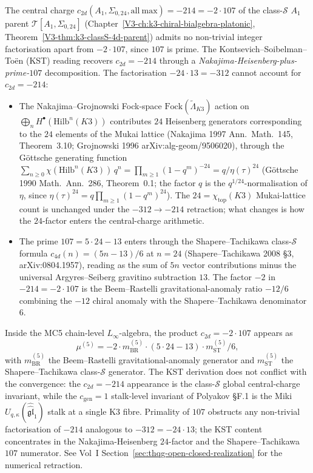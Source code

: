 \begin{remark}[Kontsevich--Soibelman--To\"en decomposition of $c_{2d}=-214$
via Nakajima/G\"ottsche]
\label{rem:mc5clmp-kst-nakajima}
The central charge
$c_{2d}(A_1, \Sigma_{0,24}, \mathrm{all\ max}) = -214 = -2\cdot 107$
of the class-$\mathcal{S}$ $A_1$ parent $\mathcal{T}[A_1,\Sigma_{0,24}]$
(Chapter~\ref{V3-ch:k3-chiral-bialgebra-platonic},
Theorem~\ref{V3-thm:k3-classS-4d-parent}) admits no non-trivial integer
factorisation apart from $-2\cdot 107$, since $107$ is prime. The
Kontsevich--Soibelman--To\"en (KST) reading recovers $c_{2d} = -214$
through a \emph{Nakajima-Heisenberg-plus-prime-$107$} decomposition.
The factorisation \(-24\cdot13=-312\) cannot account for \(c_{2d}=-214\):
\begin{itemize}
 \item The Nakajima--Grojnowski Fock-space
 $\mathrm{Fock}(\widetilde{\Lambda}_{K3})$ action on
 $\bigoplus_n H^\bullet(\mathrm{Hilb}^n(K3))$ contributes $24$
 Heisenberg generators corresponding to the $24$ elements of the
 Mukai lattice (Nakajima 1997 \textup{Ann.~Math.}~145,
 Theorem~3.10; Grojnowski 1996 \textup{arXiv:alg-geom/9506020}),
 through the G\"ottsche generating function
 $\sum_{n\ge 0}\chi(\mathrm{Hilb}^n(K3))\,q^n =
 \prod_{m\ge 1}(1-q^m)^{-24} = q/\eta(\tau)^{24}$ (G\"ottsche 1990
 \textup{Math.~Ann.}~286, Theorem~0.1; the factor $q$ is the
 $q^{1/24}$-normalisation of $\eta$, since
 $\eta(\tau)^{24}=q\prod_{m\ge1}(1-q^m)^{24}$). The $24 = \chi_{\mathrm{top}}(K3)$
 Mukai-lattice count is unchanged under the $-312 \to -214$
 retraction; what changes is how the $24$-factor enters the
 central-charge arithmetic.
 \item The prime $107 = 5\cdot 24 - 13$ enters through the
 Shapere--Tachikawa class-$\mathcal S$ formula
 $c_{4d}(n) = (5n - 13)/6$ at $n = 24$
 (Shapere--Tachikawa 2008 \S 3, arXiv:0804.1957), reading as the
 sum of $5n$ vector contributions minus the universal
 Argyres--Seiberg gravitino subtraction $13$. The factor $-2$ in
 $-214 = -2\cdot 107$ is the Beem--Rastelli gravitational-anomaly
 ratio $-12/6$ combining the $-12$ chiral anomaly with the
 Shapere--Tachikawa denominator $6$.
\end{itemize}
Inside the MC5 chain-level $L_\infty$-algebra, the product
$c_{2d} = -2\cdot 107$ appears as
\[
 \mu^{(5)}
 = -2\cdot m^{(5)}_{\mathrm{BR}} \cdot (5\cdot 24 - 13)\cdot
 m^{(5)}_{\mathrm{ST}}/6,
\]
with $m^{(5)}_{\mathrm{BR}}$ the Beem--Rastelli gravitational-anomaly
generator and $m^{(5)}_{\mathrm{ST}}$ the Shapere--Tachikawa
class-$\mathcal S$ generator. The KST derivation does not conflict with
the convergence: the $c_{2d} = -214$ appearance is the class-$\mathcal{S}$
global central-charge invariant, while the $c_{\mathrm{gen}} = 1$
stalk-level invariant of Polyakov \S F.1 is the Miki
$U_{q,\kappa}(\widehat{\widehat{\mathfrak{gl}}}_1)$ stalk at a single
K3 fibre. Primality of $107$ obstructs any non-trivial factorisation
of $-214$ analogous to $-312 = -24\cdot 13$; the KST content
concentrates in the Nakajima-Heisenberg $24$-factor and the
Shapere--Tachikawa $107$ numerator. See Vol~I
Section~\ref{sec:thqg-open-closed-realization} for the
numerical retraction.
\end{remark}

